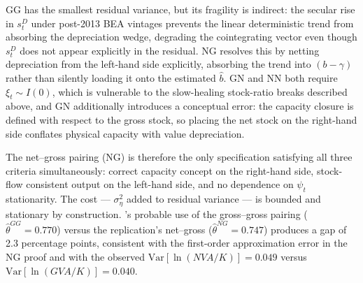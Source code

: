GG has the smallest residual variance, but its fragility is indirect: the
secular rise in $s_t^D$ under post-2013 BEA vintages prevents the linear
deterministic trend from absorbing the depreciation wedge, degrading the
cointegrating vector even though $s_t^D$ does not appear explicitly in the
residual. NG resolves this by netting depreciation from the left-hand side
explicitly, absorbing the trend into $(b - \gamma)$ rather than silently
loading it onto the estimated $\hat{b}$. GN and NN both require
$\xi_t \sim I(0)$, which is vulnerable to the slow-healing stock-ratio
breaks described above, and GN additionally introduces a conceptual error:
the capacity closure is defined with respect to the gross stock, so
placing the net stock on the right-hand side conflates physical capacity
with value depreciation.

The net--gross pairing (NG) is therefore the only specification
satisfying all three criteria simultaneously: correct capacity concept on
the right-hand side, stock-flow consistent output on the left-hand side,
and no dependence on $\psi_t$ stationarity. The cost --- $\sigma_\eta^2$
added to residual variance --- is bounded and stationary by construction.
\citet{Shaikh2016}'s probable use of the gross--gross pairing
($\hat{\theta}^{GG} = 0.770$) versus the replication's net--gross
($\hat{\theta}^{NG} = 0.747$) produces a gap of 2.3 percentage points,
consistent with the first-order approximation error in the NG proof and
with the observed $\text{Var}[\ln(NVA/K)] = 0.049$ versus
$\text{Var}[\ln(GVA/K)] = 0.040$.
